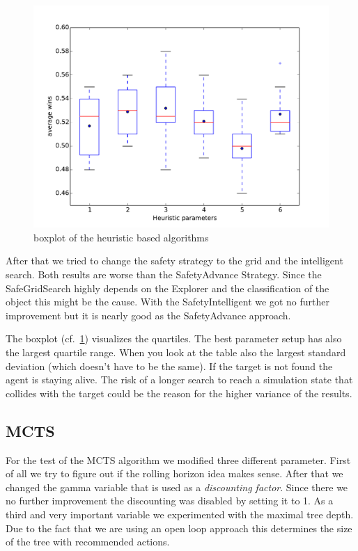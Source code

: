 \begin{figure}
\centering
\includegraphics[scale=0.5]{images/eval_heur.pdf}
\caption{boxplot of the heuristic based algorithms}
\label{fig:eval_heur}
\end{figure}

After that we tried to change the safety strategy to the grid and the intelligent search. Both results
are worse than the SafetyAdvance Strategy. Since the SafeGridSearch highly depends on the Explorer and the
classification of the object this might be the cause.
With the SafetyIntelligent we got no further improvement but it is nearly good as the SafetyAdvance approach.

The boxplot (cf.~\cref{fig:eval_heur}) visualizes the quartiles. The best parameter setup has also the largest
quartile range. When you look at the table also the largest standard deviation (which doesn't have to be the same).
If the target is not found the agent is staying alive. The risk of a longer search to reach a simulation state
that collides with the target could be the reason for the higher variance of the results.



\subsection{MCTS} 

For the test of the \ac{MCTS} algorithm we modified three different parameter. First of all we try to figure out
if the rolling horizon idea makes sense. After that we changed the gamma variable that is used
as a \textit{discounting factor}. Since there we no further improvement the discounting was disabled by setting it to 1.
As a third and very important variable we experimented with the maximal tree depth. Due to the fact that we are using an open loop approach this determines 
the size of the tree with recommended actions.


